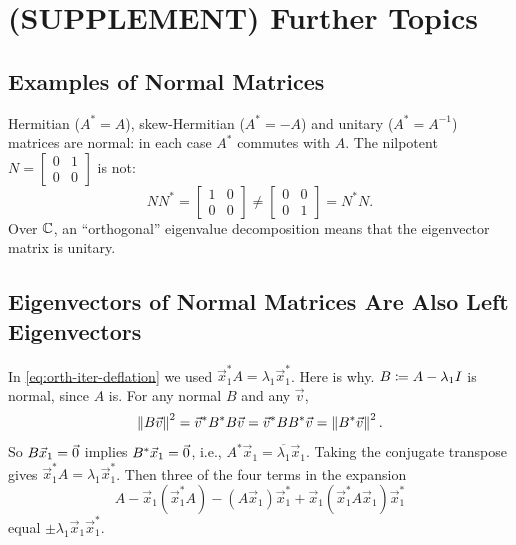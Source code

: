 \section{(SUPPLEMENT) Further Topics}
\label{sec:orth-iter-supp}

\subsection{Examples of Normal Matrices}
\label{sec:normal-examples}

Hermitian ($A^\ast = A$), skew-Hermitian ($A^\ast = -A$) and unitary ($A^\ast = A^{-1}$) matrices are normal: in each case $A^\ast$ commutes with $A$. The nilpotent $N = \left[\begin{smallmatrix} 0 & 1 \\ 0 & 0 \end{smallmatrix}\right]$ is not:
\begin{equation}
  NN^\ast = \begin{bmatrix} 1 & 0 \\ 0 & 0 \end{bmatrix} \ne \begin{bmatrix} 0 & 0 \\ 0 & 1 \end{bmatrix} = N^\ast N.
\end{equation}
Over $\mathbb{C}$, an ``orthogonal'' eigenvalue decomposition means that the eigenvector matrix is unitary.

\subsection{Eigenvectors of Normal Matrices Are Also Left Eigenvectors}
\label{sec:normal-left-eigvec}

In \cref{eq:orth-iter-deflation} we used $\vec{x}_1^\ast A = \lambda_1\vec{x}_1^\ast$. Here is why. $B \coloneqq A - \lambda_1I$ is normal, since $A$ is. For any normal $B$ and any $\vec{v}$,
\begin{equation}
  \left\lVert B\vec{v} \right\rVert^2 = \vec{v}^\ast B^\ast B\vec{v} = \vec{v}^\ast BB^\ast\vec{v} = \left\lVert B^\ast\vec{v} \right\rVert^2.
\end{equation}
So $B\vec{x}_1 = \vec{0}$ implies $B^\ast\vec{x}_1 = \vec{0}$, i.e., $A^\ast\vec{x}_1 = \overline{\lambda_1}\vec{x}_1$. Taking the conjugate transpose gives $\vec{x}_1^\ast A = \lambda_1\vec{x}_1^\ast$. Then three of the four terms in the expansion
\begin{equation}
  A - \vec{x}_1(\vec{x}_1^\ast A) - (A\vec{x}_1)\vec{x}_1^\ast + \vec{x}_1(\vec{x}_1^\ast A\vec{x}_1)\vec{x}_1^\ast
\end{equation}
equal $\pm\lambda_1\vec{x}_1\vec{x}_1^\ast$.

